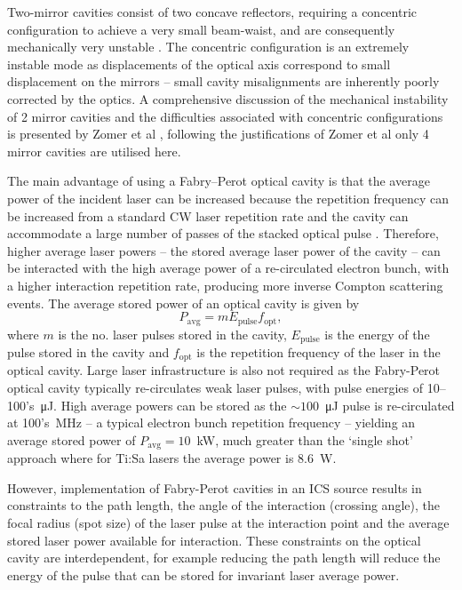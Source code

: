 \documentclass[../main.tex]{subfiles}
\begin{document}
Two-mirror cavities consist of
two concave reflectors, requiring a concentric configuration to achieve a very small beam-waist, and are consequently mechanically very unstable \cite{dupraz2015abcd}. The concentric configuration is an extremely instable mode as displacements of the optical axis
correspond to small displacement on the mirrors \cite{variola2011luminosity} -- small cavity misalignments are inherently poorly corrected by the optics. A comprehensive discussion of the mechanical instability of 2 mirror cavities and the difficulties associated with concentric configurations is presented by Zomer et al \cite{zomer2009polarization}, following the justifications of Zomer et al only 4 mirror cavities are utilised here. 

The main advantage of using a Fabry--Perot optical cavity is that the average power of the incident laser can be increased because the repetition frequency can be increased from a standard CW laser repetition rate and the cavity can accommodate a large number of passes of the stacked optical pulse \cite{variola2011luminosity}. Therefore, higher average laser powers -- the stored average laser power of the cavity -- can be interacted with the high average power of a re-circulated electron bunch, with a higher interaction repetition rate, producing more inverse Compton scattering events. The average stored power of an optical cavity is given by
\begin{equation}
P_{\mathrm{avg}} = mE_{\mathrm{pulse}}f_{\mathrm{opt}},
\label{eq:average_stored_power_cavity}    
\end{equation}
where $m$ is the no. laser pulses stored in the cavity, $E_{\mathrm{pulse}}$ is the energy of the pulse stored in the cavity and $f_{\mathrm{opt}}$ is the repetition frequency of the laser in the optical cavity. Large laser infrastructure is also not required as the Fabry-Perot optical cavity typically re-circulates weak laser pulses, with pulse energies of 10--100's~\si{\micro\joule}. High average powers can be stored as the $\sim100$~\si{\micro\joule} pulse is re-circulated at 100's~\si{\mega\hertz} -- a typical electron bunch repetition frequency -- yielding an average stored power of $P_{\mathrm{avg}}= 10$~\si{\kilo\watt}, much greater than the `single shot' approach where for Ti:Sa lasers the average power is 8.6~\si{\watt}.

However, implementation of Fabry-Perot cavities in an ICS source results in constraints to the path length, the angle of the interaction (crossing angle), the focal radius (spot size) of the laser pulse at the interaction point and the average stored laser power available for interaction. These constraints on the optical cavity are interdependent, for example reducing the path length will reduce the energy of the pulse that can be stored for invariant laser average power.
\end{document}
